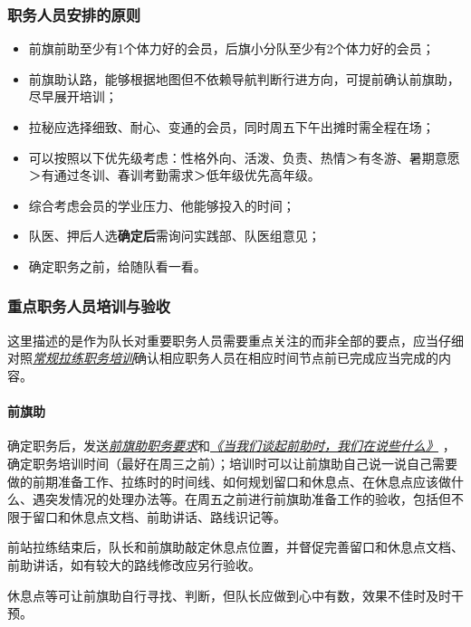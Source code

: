 \documentclass[UTF8]{ctexart}
\begin{document}
\subsubsection{职务人员安排的原则}

\begin{itemize}[nosep,left=2em]
    \item 前旗前助至少有1个体力好的会员，后旗小分队至少有2个体力好的会员；
    \item 前旗助认路，能够根据地图但不依赖导航判断行进方向，可提前确认前旗助，尽早展开培训；
    \item 拉秘应选择细致、耐心、变通的会员，同时周五下午出摊时需全程在场；
    \item 可以按照以下优先级考虑：性格外向、活泼、负责、热情＞有冬游、暑期意愿＞有通过冬训、春训考勤需求＞低年级优先高年级。
    \item 综合考虑会员的学业压力、他能够投入的时间；
    \item 队医、押后人选\textbf{确定后}需询问实践部、队医组意见；
    \item 确定职务之前，给随队看一看。    
\end{itemize}

\subsubsection{重点职务人员培训与验收}

这里描述的是作为队长对重要职务人员需要重点关注的而非全部的要点，应当仔细对照\href{https://chexie.net/bbs/content/?bid=7&tid=1062&p=1}{\textit{常规拉练职务培训}}确认相应职务人员在相应时间节点前已完成应当完成的内容。

\paragraph{前旗助}

确定职务后，发送\href{https://chexie.net/bbs/content/?bid=7&tid=1062&p=1#2}{\textit{前旗助职务要求}}和\href{https://www.chexie.net/bbs/content/?bid=7&tid=879&p=1}{\textit{《当我们谈起前助时，我们在说些什么》}}
，确定职务培训时间（最好在周三之前）；培训时可以让前旗助自己说一说自己需要做的前期准备工作、拉练时的时间线、如何规划留口和休息点、在休息点应该做什么、遇突发情况的处理办法等。在周五之前进行前旗助准备工作的验收，包括但不限于留口和休息点文档、前助讲话、路线识记等。

前站拉练结束后，队长和前旗助敲定休息点位置，并督促完善留口和休息点文档、前助讲话，如有较大的路线修改应另行验收。

休息点等可让前旗助自行寻找、判断，但队长应做到心中有数，效果不佳时及时干预。
\end{document}
